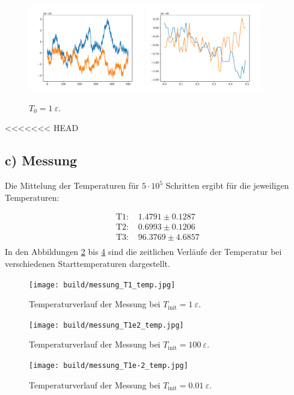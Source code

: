 \begin{figure}
    \centering
    \includegraphics[width=0.45\textwidth]{A1/build/aequi1_V.pdf}
    \includegraphics[width=0.45\textwidth]{A1/build/aequi1_VV.pdf}
    \caption{$T_\text{0} = 1\:\varepsilon$.}
    \label{fig:v1}
\end{figure}

\FloatBarrier
<<<<<<< HEAD
\subsection*{c) Messung}
Die Mittelung der Temperaturen für $5\cdot 10^5$ Schritten ergibt für die jeweiligen Temperaturen:

\begin{align}
    \text{ T1:  } &  1.4791  \pm  0.1287 \\
    \text{ T2:  } &  0.6993  \pm  0.1206 \\
    \text{ T3:  } & 96.3769  \pm  4.6857 \\
\end{align}
In den Abbildungen \ref{fig:messung_T=1_temp} bis \ref{fig:messung_T=1e-2_temp}
sind die zeitlichen Verläufe der Temperatur
bei verschiedenen Starttemperaturen dargestellt.

\begin{figure}
    \centering
    \texttt{[image: build/messung\_T1\_temp.jpg]}
    \caption{Temperaturverlauf der Messung bei $T_\text{init} = 1\:\varepsilon$.}
    \label{fig:messung_T=1_temp}
\end{figure}
\begin{figure}
    \centering
    \texttt{[image: build/messung\_T1e2\_temp.jpg]}
    \caption{Temperaturverlauf der Messung bei $T_\text{init} = 100\:\varepsilon$.}
    \label{fig:messung_T=1e2_temp}
\end{figure}
\begin{figure}
    \centering
    \texttt{[image: build/messung\_T1e-2\_temp.jpg]}
    \caption{Temperaturverlauf der Messung bei $T_\text{init} = 0.01\:\varepsilon$.}
    \label{fig:messung_T=1e-2_temp}
\end{figure}


